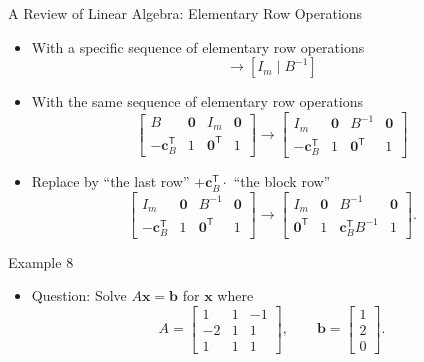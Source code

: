 \documentclass[aspectratio=169,hyperref,UTF8,CJK]{beamer}
\newcommand{\trans}{\mathsf{T}}
\newcommand{\vect}[1]{\boldsymbol{#1}}
\begin{document}
\begin{frame}{A Review of Linear Algebra: Elementary Row Operations}
  \footnotesize
  \begin{itemize}
    \item With a specific sequence of elementary row operations
      \begin{equation*}
        [B\mid I_m]\longrightarrow[I_m\mid B^{-1}]
      \end{equation*}
    \item With the same sequence of elementary row operations
      \begin{equation*}
        \left[\begin{array}{cc|cc}B&\vect{0}&I_m&\vect{0}\\-\vect{c}_B^{\trans}&1&\vect{0}^{\trans}&1\end{array}\right]
        \longrightarrow
        \left[\begin{array}{cc|cc}I_m&\vect{0}&B^{-1}&\vect{0}\\-\vect{c}_B^{\trans}&1&\vect{0}^{\trans}&1\end{array}\right]
      \end{equation*}
    \item Replace by ``the last row'' $+\vect{c}_B^{\trans}\cdot$ ``the block row''
      \begin{equation*}
        \left[\begin{array}{cc|cc}I_m&\vect{0}&B^{-1}&\vect{0}\\-\vect{c}_B^{\trans}&1&\vect{0}^{\trans}&1\end{array}\right]
        \longrightarrow
        \left[\begin{array}{cc|cc}I_m&\vect{0}&B^{-1}&\vect{0}\\\vect{0}^{\trans}&1&\vect{c}_B^{\trans}B^{-1}&1\end{array}\right].
      \end{equation*}
  \end{itemize}
\end{frame}

\begin{frame}{Example 8}
  \begin{itemize}
    \item Question: Solve $A\vect{x}=\vect{b}$ for $\vect{x}$ where
      \begin{equation*}
        A=\begin{bmatrix}1&1&-1\\-2&1&1\\1&1&1\end{bmatrix},
        \qquad
        \vect{b}=\begin{bmatrix}1\\2\\0\end{bmatrix}.
      \end{equation*}
  \end{itemize}
\end{frame}
\end{document}
